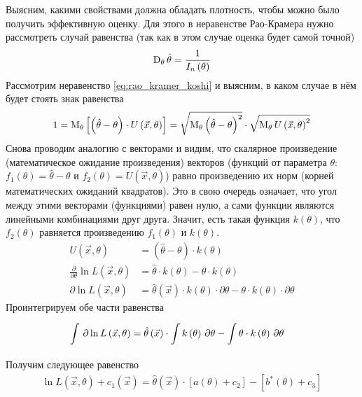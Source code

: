 Выясним, какими свойствами должна обладать плотность,
чтобы можно было получить эффективную оценку.
Для этого в неравенстве Рао-Крамера нужно рассмотреть случай равенства
(так как в этом случае оценка будет самой точной)
\begin{equation*}
  \operatorname{D}_{\theta} \hat{\theta}= \frac{1}{I_n\left(\theta\right)}
\end{equation*}
Рассмотрим неравенство \eqref{eq:rao_kramer_koshi} и выясним,
в каком случае в нём будет стоять знак равенства
\begin{equation*}
  1
  = \operatorname{M}_{\theta} 
    \left[\left( \hat{\theta} - \theta \right)
      \cdot U\left( \vec{x}, \theta \right)\right]
  = \sqrt{\operatorname{M}_{\theta} 
    \left(\hat{\theta}-\theta\right)^2}
    \cdot \sqrt{\operatorname{M}_{\theta} U\left( \vec{x}, \theta \right)^2}
\end{equation*}
Снова проводим аналогию с векторами и видим,
что скалярное произведение (математическое ожидание произведения)
векторов
(функций от параметра $\theta$:
$f_1\left( \theta \right)= \hat{\theta}-\theta$ и
$f_2\left( \theta \right)=U\left( \vec{x},\theta \right)$)
равно произведению их норм (корней математических ожиданий квадратов).
Это в свою очередь означает,
что угол между этими векторами (функциями) равен нулю,
а сами функции являются линейными комбинациями друг друга.
Значит, есть такая функция $k\left( \theta \right)$, что
$f_2\left( \theta \right)$ равняется произведению
$f_1\left( \theta \right)$ и $k\left( \theta \right)$.
\begin{align*}
  U\left( \vec{x},\theta \right)
    &= \left( \hat{\theta}-\theta \right)\cdot k\left( \theta \right)\\
  \frac{\partial}{\partial\theta}\ln{L\left( \vec{x},\theta \right)}
    &= \hat{\theta}\cdot k\left( \theta \right)
      -\theta \cdot k\left( \theta \right)\\
  \partial\ln{L\left( \vec{x},\theta \right)}
    &= \hat{\theta}\left( \vec{x} \right)
        \cdot k\left( \theta \right)\cdot \partial\theta
      -\theta \cdot k\left( \theta \right)\cdot \partial\theta
\end{align*}
Проинтегрируем обе части равенства
\begin{align*}
  \int\limits_{}^{}  \, \partial \ln{L\left( \vec{x},\theta \right)}
    &= \hat{\theta}\left( \vec{x} \right)
        \cdot \int\limits_{}^{} k\left( \theta \right) \, \partial \theta
      -\int\limits_{}^{} \theta \cdot k\left( \theta \right) \, \partial \theta
\end{align*}
Получим следующее равенство
\begin{align*}
  \ln{L\left( \vec{x},\theta \right)}+c_1\left( \vec{x} \right)
    = \hat{\theta}\left( \vec{x} \right)
        \cdot \left[ a\left( \theta \right)+c_2\right]
      -\left[b^*\left( \theta \right)+c_3\right]
\end{align*}
